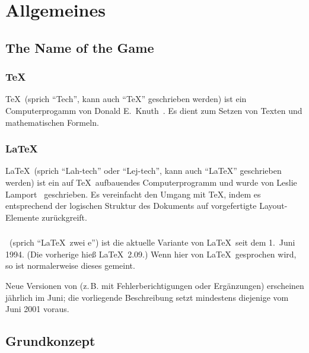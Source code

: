 

\section{Allgemeines}
 
\subsection{The Name of the Game}
 
\subsubsection{\TeX}

\TeX\ (sprich "`Tech"', kann auch "`TeX"' geschrieben werden) ist
ein Computerprogamm von Donald E.~Knuth~\cite{texbook,schwarz}.
Es dient zum Setzen 
von Texten und mathematischen Formeln.
 
\subsubsection{\LaTeX}
 
\LaTeX\ (sprich "`Lah-tech"' oder "`Lej-tech"', kann auch
"`LaTeX"' geschrieben werden) ist ein auf \TeX\ auf\/bauendes 
Computerprogramm und wurde von Leslie Lamport~\cite{manual,wonne} 
geschrieben.  Es vereinfacht den Umgang mit \TeX, indem es 
entsprechend der logischen Struktur des Dokuments auf vorgefertigte
Layout-Elemente zurückgreift.

\subsubsection{\LaTeXe}

\LaTeXe\ (sprich "`\LaTeX\ zwei e"') ist die aktuelle Variante von
\LaTeX\ seit dem 1.~Juni 1994.  (Die vorherige hieß \LaTeX~2.09.)
Wenn hier von \LaTeX\ gesprochen wird, so ist normalerweise dieses
\LaTeXe{} gemeint.

Neue Versionen
von \LaTeXe{} (z.\,B. mit Fehlerberichtigungen oder Ergänzungen)
erscheinen jährlich im Juni; die vorliegende Beschreibung setzt 
mindestens diejenige vom Juni 2001 voraus.  

\subsection{Grundkonzept}
 
